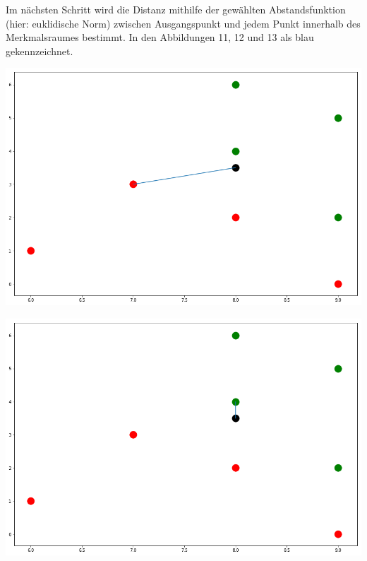 \documentclass[fontsize=11pt]{scrartcl}
\newenvironment{Figure}
  {\par\medskip\noindent\minipage{\linewidth}}
  {\endminipage\par\medskip}
\begin{document}
                Im nächsten Schritt wird die Distanz mithilfe der gewählten Abstandsfunktion (hier: euklidische Norm) zwischen Ausgangspunkt und jedem Punkt innerhalb des Merkmalsraumes bestimmt. In den Abbildungen 11, 12 und 13 als blau gekennzeichnet. 
                        
                
                \begin{Figure}
                    \begin{minipage}[b]{.4\linewidth}
                        \includegraphics[width=\linewidth]{nn3.png}
                    \end{minipage}
                    \hspace*{.1\linewidth}
                    \begin{minipage}[b]{.4\linewidth}
                        \includegraphics[width=\linewidth]{nn5.png}
                    \end{minipage}
                \end{Figure}        
                
\end{document}
